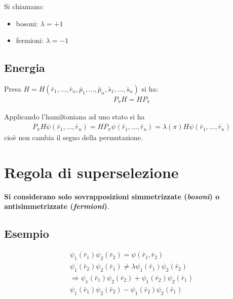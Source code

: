 Si chiamano:
\begin{itemize}
\item bosoni: $\lambda=+1$
\item fermioni: $\lambda=-1$
\end{itemize}

\subsection{Energia} %
Presa $H=H\left(\bar r_1,\dots,\bar r_n,\bar p_1,\dots,\bar p_n,\bar s_1,\dots,\bar s_n\right)$ si ha:
\begin{equation}\begin{split}
P_\pi H=HP_\pi
\end{split}\end{equation}

Applicando l'hamiltoniana ad uno stato si ha
\begin{equation}\begin{split}
P_\pi H\psi \left(\bar r_1,\dots,\bar r_n\right)=HP_\pi \psi \left(\bar r_1,\dots,\bar r_n\right)=\lambda\left(\pi\right)H\psi \left(\bar r_1,\dots,\bar r_n\right)
\end{split}\end{equation}
cioè non cambia il segno della permutazione.

\section{Regola di superselezione} %
\textbf{Si considerano solo sovrapposizioni simmetrizzate (\emph{bosoni}) o antisimmetrizzate (\emph{fermioni})}.

\subsection{Esempio} %
\begin{equation}\begin{split}
\psi _1\left(\bar r_1\right)\psi _2\left(\bar r_2\right)=\psi \left(\bar r_1,\bar r_2\right) \\
\psi _1\left(\bar r_2\right)\psi _2\left(\bar r_1\right)\neq \lambda \psi _1\left(\bar r_1\right)\psi _2\left(\bar r_2\right) \\
\Longrightarrow \psi _1\left(\bar r_1\right)\psi _2\left(\bar r_2\right)+\psi _1\left(\bar r_2\right)\psi _2\left(\bar r_1\right) \\
\psi _1\left(\bar r_1\right)\psi _2\left(\bar r_2\right)-\psi _1\left(\bar r_2\right)\psi _2\left(\bar r_1\right)
\end{split}\end{equation}

